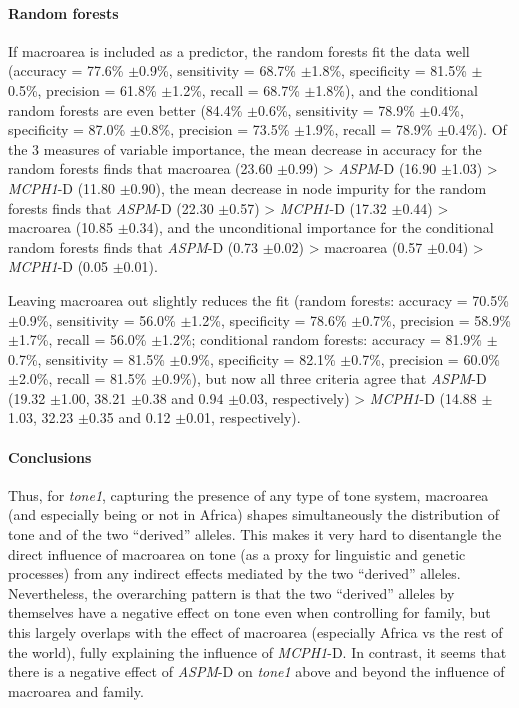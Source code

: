 \documentclass[twoside,onecolumn]{article}
\begin{document}
\paragraph{Random forests}

If macroarea is included as a predictor, the random forests fit the data well (accuracy = 77.6\% $\pm$0.9\%, sensitivity = 68.7\% $\pm$1.8\%, specificity = 81.5\% $\pm$0.5\%, precision = 61.8\% $\pm$1.2\%, recall = 68.7\% $\pm$1.8\%), and the conditional random forests are even better (84.4\% $\pm$0.6\%, sensitivity = 78.9\% $\pm$0.4\%, specificity = 87.0\% $\pm$0.8\%, precision = 73.5\% $\pm$1.9\%, recall = 78.9\% $\pm$0.4\%).
Of the 3 measures of variable importance, the mean decrease in accuracy for the random forests finds that macroarea (23.60 $\pm$0.99) > \textit{ASPM}-D (16.90 $\pm$1.03) > \textit{MCPH1}-D (11.80 $\pm$0.90), the mean decrease in node impurity for the random forests finds that \textit{ASPM}-D (22.30 $\pm$0.57) > \textit{MCPH1}-D (17.32 $\pm$0.44) > macroarea (10.85 $\pm$0.34), and the unconditional importance for the conditional random forests finds that \textit{ASPM}-D (0.73 $\pm$0.02) > macroarea (0.57 $\pm$0.04) > \textit{MCPH1}-D (0.05 $\pm$0.01).

Leaving macroarea out slightly reduces the fit (random forests: accuracy = 70.5\% $\pm$0.9\%, sensitivity = 56.0\% $\pm$1.2\%, specificity = 78.6\% $\pm$0.7\%, precision = 58.9\% $\pm$1.7\%, recall = 56.0\% $\pm$1.2\%; conditional random forests: accuracy = 81.9\% $\pm$0.7\%, sensitivity = 81.5\% $\pm$0.9\%, specificity = 82.1\% $\pm$0.7\%, precision = 60.0\% $\pm$2.0\%, recall = 81.5\% $\pm$0.9\%), but now all three criteria agree that \textit{ASPM}-D (19.32 $\pm$1.00, 38.21 $\pm$0.38 and 0.94 $\pm$0.03, respectively) > \textit{MCPH1}-D (14.88 $\pm$1.03, 32.23 $\pm$0.35 and 0.12 $\pm$0.01, respectively).


\paragraph{Conclusions}

Thus, for \textit{tone1}, capturing the presence of any type of tone system, macroarea (and especially being or not in Africa) shapes simultaneously the distribution of tone and of the two ``derived'' alleles.
This makes it very hard to disentangle the direct influence of macroarea on tone (as a proxy for linguistic and genetic processes) from any indirect effects mediated by the two ``derived'' alleles.
Nevertheless, the overarching pattern is that the two ``derived'' alleles by themselves have a negative effect on tone even when controlling for family, but this largely overlaps with the effect of macroarea (especially Africa vs the rest of the world), fully explaining the influence of \textit{MCPH1}-D.
In contrast, it seems that there is a negative effect of \textit{ASPM}-D on \textit{tone1} above and beyond the influence of macroarea and family.
\end{document}
